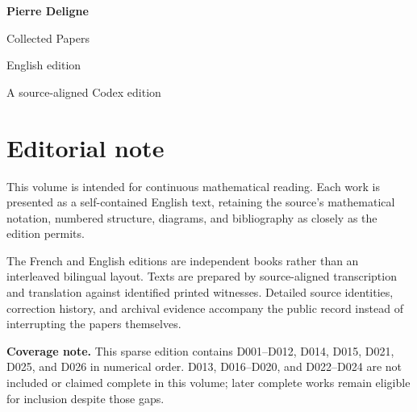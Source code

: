 \documentclass[11pt,a4paper]{article}
\begin{document}
\begin{titlepage}
  \pagecolor{DeligneBlue}
  \color{white}
  \vspace*{34mm}
  {\fontsize{30}{36}\selectfont\bfseries Pierre Deligne\par}
  \vspace{7mm}
  {\fontsize{18}{23}\selectfont Collected Papers\par}
  \vspace{4mm}
  {\large English edition\par}
  \vfill
  {\normalsize A source-aligned Codex edition\par}
\end{titlepage}
\setcounter{page}{2}
\nopagecolor
\color{DeligneInk}
\section*{Editorial note}
This volume is intended for continuous mathematical reading. Each work is presented as a self-contained English text, retaining the source's mathematical notation, numbered structure, diagrams, and bibliography as closely as the edition permits.

The French and English editions are independent books rather than an interleaved bilingual layout. Texts are prepared by source-aligned transcription and translation against identified printed witnesses. Detailed source identities, correction history, and archival evidence accompany the public record instead of interrupting the papers themselves.

\textbf{Coverage note.} This sparse edition contains D001--D012, D014, D015, D021, D025, and D026 in numerical order. D013, D016--D020, and D022--D024 are not included or claimed complete in this volume; later complete works remain eligible for inclusion despite those gaps.
\end{document}
